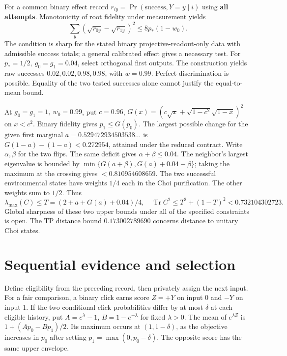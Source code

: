 \documentclass[
  10pt,
  a4paper,
]{article}
\begin{document}
For a common binary effect record \(r_{iy}=\Pr(\mathrm{success},Y=y\mid i)\) using \textbf{all attempts}. Monotonicity of root fidelity under measurement yields \[
  \sum_y(\sqrt{r_{0y}}-\sqrt{r_{1y}})^2\le8p_*(1-w_0).
\] The condition is sharp for the stated binary projective-readout-only data with admissible success totals; a general calibrated effect gives a necessary test. For \(p_*=1/2,\ g_0=g_1=0.04\), select orthogonal first outputs. The construction yields raw successes \(0.02,0.02,0.98,0.98\), with \(w=0.99\). Perfect discrimination is possible. Equality of the two tested successes alone cannot justify the equal-to-mean bound.

At \(g_0=g_1=1,\ w_0=0.99\), put \(c=0.96\), \(G(x)=(c\sqrt x+\sqrt{1-c^2}\sqrt{1-x})^2\) on \(x<c^2\). Binary fidelity gives \(p_1\le G(p_0)\). The largest possible change for the given first marginal \(a=0.529472934503538\ldots\) is \(G(1-a)-(1-a)<0.272954\), attained under the reduced contract. Write \(\alpha,\beta\) for the two flips. The same deficit gives \(\alpha+\beta\le0.04\). The neighbor's largest eigenvalue is bounded by \(\min\{G(a+\beta),G(a)+0.04-\beta\}\); taking the maximum at the crossing gives \(<0.810954608659\). The two successful environmental states have weights \(1/4\) each in the Choi purification. The other weights sum to \(1/2\). Thus \[
 \lambda_{\max}(C)\le T=(2+a+G(a)+0.04)/4,\quad
 \operatorname{Tr}C^2\le T^2+(1-T)^2<0.732104302723 .
\] Global sharpness of these two upper bounds under all of the specified constraints is open. The TP distance bound \(0.173002789690\) concerns distance to unitary Choi states.

\newpage

\section{Sequential evidence and selection}\label{sequential-evidence-and-selection}

Define eligibility from the preceding record, then privately assign the next input. For a fair comparison, a binary click earns score \(Z=+Y\) on input 0 and \(-Y\) on input 1. If the two conditional click probabilities differ by at most \(\delta\) at each eligible history, put \(A=e^\lambda-1\), \(B=1-e^{-\lambda}\) for fixed \(\lambda>0\). The mean of \(e^{\lambda Z}\) is \(1+(Ap_0-Bp_1)/2\). Its maximum occurs at \((1,1-\delta)\), as the objective increases in \(p_0\) after setting \(p_1=\max(0,p_0-\delta)\). The opposite score has the same upper envelope.
\end{document}
